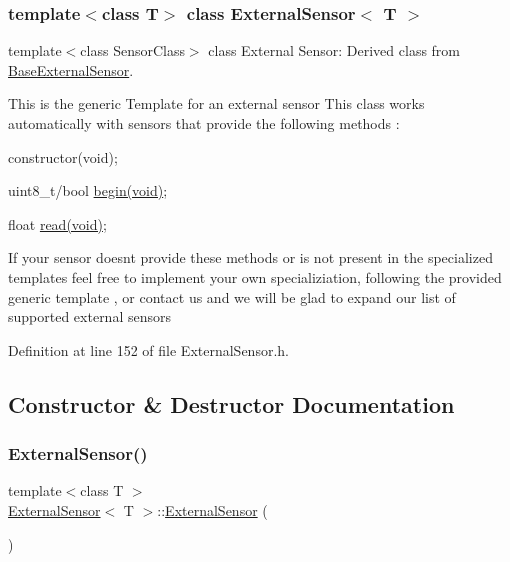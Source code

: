 \subsubsection*{template$<$class T$>$\newline
class External\+Sensor$<$ T $>$}

template$<$class Sensor\+Class$>$ class External Sensor\+: Derived class from \hyperlink{class_base_external_sensor}{Base\+External\+Sensor}. 

This is the generic Template for an external sensor This class works automatically with sensors that provide the following methods \+:
\begin{DoxyItemize}
\item constructor(void);
\item uint8\+\_\+t/bool \hyperlink{class_external_sensor_ab6fe1379d55b656a048e0fba1e0a32e6}{begin(void)};
\item float \hyperlink{class_external_sensor_a5fb3afc7d244fb86dac68ab5481bc407}{read(void)};
\end{DoxyItemize}

If your sensor doesn\textquotesingle{}t provide these methods or is not present in the specialized templates feel free to implement your own specializiation, following the provided generic template , or contact us and we will be glad to expand our list of supported external sensors 

Definition at line 152 of file External\+Sensor.\+h.



\subsection{Constructor \& Destructor Documentation}
\mbox{\label{class_external_sensor_a8b991447fba33253103d06198b838751}} 
\subsubsection{\texorpdfstring{External\+Sensor()}{ExternalSensor()}}
{\footnotesize\ttfamily template$<$class T $>$ \\
\hyperlink{class_external_sensor}{External\+Sensor}$<$ T $>$\+::\hyperlink{class_external_sensor}{External\+Sensor} (\begin{DoxyParamCaption}{ }\end{DoxyParamCaption})\hspace{0.3cm}{\ttfamily [inline]}}

